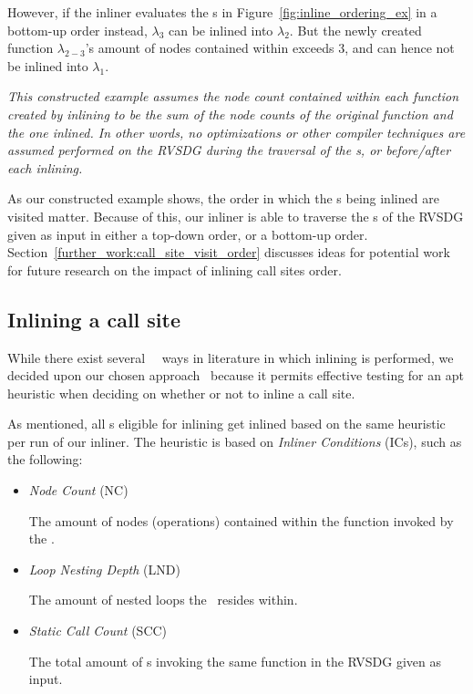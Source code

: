 However, if the inliner evaluates the \applyNode s in
Figure~\ref{fig:inline_ordering_ex} in a bottom-up order instead, $\lambda_3$
can be inlined into $\lambda_2$. But the newly created function
$\lambda_{2-3}$'s amount of nodes contained within exceeds 3, and can hence not
be inlined into $\lambda_1$.

\textit{This constructed example assumes the node count contained within each
function created by inlining to be the sum of the node counts of the original
function and the one inlined. In other words, no optimizations or other compiler
techniques are assumed performed on the RVSDG during the traversal of the
\applyNode s, or before/after each inlining.}

As our constructed example shows, the order in which the \applyNode s being
inlined are visited matter. Because of this, our inliner is able to traverse the
\applyNode s of the RVSDG given as input in either a top-down order, or a
bottom-up order. Section~\ref{further_work:call_site_visit_order} discusses
ideas for potential work for future research on the impact of inlining call
sites order.

\subsection{Inlining a call site}
\label{sub:scheme:inlining_apply_nodes}

While there exist several~\cite{GHCPaper}~\cite{AdaptvStratInlSubst} ways in
literature in which inlining is performed, we decided upon our chosen
approach~\cite{AdaptvCompilAndInlingWaterman} because it permits effective
testing for an apt heuristic when deciding on whether or not to inline a call
site.

As mentioned, all \applyNode s eligible for inlining get inlined based on the
same heuristic per run of our inliner. The heuristic is based on \textit{Inliner
Conditions} (ICs), such as the following:


\begin{itemize}
	\item \textit{Node Count} (NC)

The amount of nodes (operations) contained within the function invoked by the
\applyNode .

	\item \textit{Loop Nesting Depth} (LND)

The amount of nested loops the \applyNode~resides within.

	\item \textit{Static Call Count} (SCC)

The total amount of \applyNode s invoking the same function in the RVSDG given
as input.
\end{itemize}

